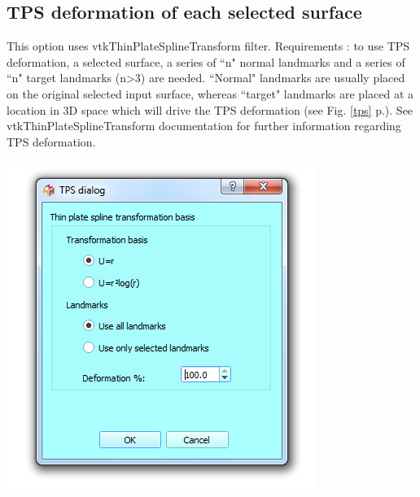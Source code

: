 \subsection{TPS deformation of each selected surface}
\noindent
\begin{minipage}{0.5\textwidth}
This option uses vtkThinPlateSplineTransform filter.
Requirements : to use TPS deformation, a selected surface,
a series of ``n" normal landmarks and a series of ``n"
target landmarks (n>3) are needed. ``Normal" landmarks
are usually placed on the original selected input surface,
whereas ``target" landmarks are placed at a location in 3D
space which will drive the TPS deformation (see Fig. \ref{tps} p.\pageref{tps}). See vtkThinPlateSplineTransform documentation for further information regarding TPS deformation.

\end{minipage}    
\begin{minipage}{0.5\textwidth}\centering
  \includegraphics[scale=0.5]{images/09/structure/tps_dialog.png}
 \end{minipage} 
\noindent

